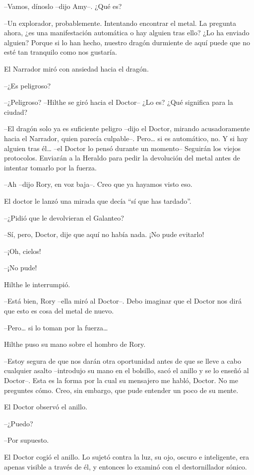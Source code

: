 {--Vamos, dínoslo --dijo Amy--. ¿Qué es?}

{--Un explorador, probablemente. Intentando encontrar el metal. La
	pregunta ahora, ¿es una manifestación automática o hay alguien tras
	ello? ¿Lo ha enviado alguien? Porque si lo han hecho, nuestro dragón
durmiente de aquí puede que no esté tan tranquilo como nos gustaría.}

{El Narrador miró con ansiedad hacia el dragón.}

{--¿Es peligroso?}

{--¿Peligroso? --Hilthe se giró hacia el Doctor-- ¿Lo es? ¿Qué
significa para la ciudad?}

{--El dragón solo ya es suficiente peligro --dijo el Doctor, mirando
	acusadoramente hacia el Narrador, quien parecía culpable--. Pero\ldots{}
	si es automático, no. Y si hay alguien tras él\ldots{} --el Doctor lo
	pensó durante un momento-- Seguirán los viejos protocolos. Enviarán a la
	Heraldo para pedir la devolución del metal antes de intentar tomarlo por
la fuerza.}

{--Ah --dijo Rory, en voz baja--. Creo que ya hayamos visto eso.}

{El doctor le lanzó una mirada que decía ``sí que has tardado''.}

{--¿Pidió que le devolvieran el Galanteo?}

{--Sí, pero, Doctor, dije que aquí no había nada. ¡No pude evitarlo!}

{--¡Oh, cielos!}

{--¡No pude!}

{Hilthe le interrumpió.}

{--Está bien, Rory --ella miró al Doctor--. Debo imaginar que el
Doctor nos dirá que esto es cosa del metal de nuevo.}

{--Pero\ldots{} si lo toman por la fuerza\ldots{}}

{Hilthe puso su mano sobre el hombro de Rory.}

{--Estoy segura de que nos darán otra oportunidad antes de que se
	lleve a cabo cualquier asalto --introdujo su mano en el bolsillo, sacó
	el anillo y se lo enseñó al Doctor--. Esta es la forma por la cual su
	mensajero me habló, Doctor. No me preguntes cómo. Creo, sin embargo, que
pude entender un poco de su mente.}

{El Doctor observó el anillo.}

{--¿Puedo?}

{--Por supuesto.}

{El Doctor cogió el anillo. Lo sujetó contra la luz, su ojo, oscuro e
	inteligente, era apenas visible a través de él, y entonces lo examinó
con el destornillador sónico.}

